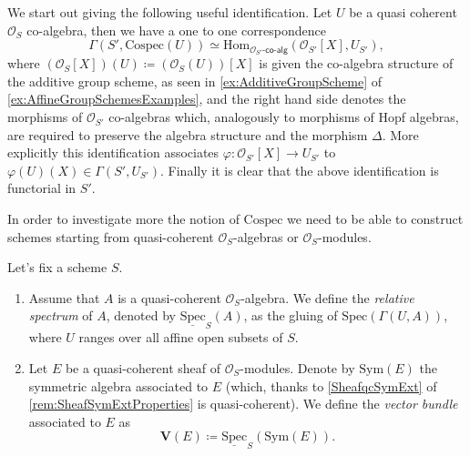 \begin{rem}[]\label{rem:CospecSections}
	We start out giving the following useful identification.
	Let $U$ be a quasi coherent $\mathcal{O}_{ S }$ co-algebra,
	then we have a one to one correspondence
	\begin{equation*}
	\Gamma(S', \mathrm{Cospec}(U)) \simeq
	\mathrm{Hom}_{ \mathcal{O}_{ S' }\text{-}\mathsf{co}\text{-}\mathsf{alg}} 
	\left( \mathcal{O}_{ S' }[X], U_{S'} \right)
	,\end{equation*}
	where $(\mathcal{O}_{ S }[X])(U) \coloneqq (\mathcal{O}_{ S }(U))[X]$ 
	is given the co-algebra structure of the additive group scheme, as seen in
	\cref{ex:AdditiveGroupScheme} of \cref{ex:AffineGroupSchemesExamples},
	and the right hand side denotes the morphisms of $\mathcal{O}_{ S' }$
	co-algebras which, analogously to morphisms of Hopf algebras, 
	are required to preserve the algebra structure and the morphism $\Delta$.
	More explicitly this identification associates
	$\varphi\colon \mathcal{O}_{ S' }[X] \to U_{S'}$ to
	$\varphi(U)(X) \in \Gamma(S', U_{S'})$.
	Finally it is clear that the above identification is functorial in $S'$.
\end{rem}


\noindent
In order to investigate more the notion of $\mathrm{Cospec}$ we need to 
be able to construct schemes starting from quasi-coherent $\mathcal{O}_{ S }$-algebras
or $\mathcal{O}_{ S }$-modules.


\begin{defn}
	Let's fix a scheme $S$.
\begin{enumerate}
	\item Assume that $A$ is a quasi-coherent $\mathcal{O}_{ S }$-algebra.
		We define the {\em relative spectrum} of $A$, denoted by
		$\underline{\mathrm{Spec}}_S(A)$, as the gluing of
		$\mathrm{Spec}(\Gamma(U, A))$, where $U$ ranges
		over all affine open subsets of $S$.

	\item  Let $E$ be a quasi-coherent sheaf of $\mathcal{O}_{ S }$-modules.
		Denote by $\mathrm{Sym}(E)$ the symmetric algebra associated to 
		$E$ (which, thanks to \cref{SheafqcSymExt} of
		\cref{rem:SheafSymExtProperties} is quasi-coherent).
		We define the {\em vector bundle} associated to $E$ as
		\begin{equation*}
			\mathbf{V}(E) \coloneqq
			\underline{\mathrm{Spec}}_S (\mathrm{Sym}(E))
		.\end{equation*}
\end{enumerate}
\end{defn}


